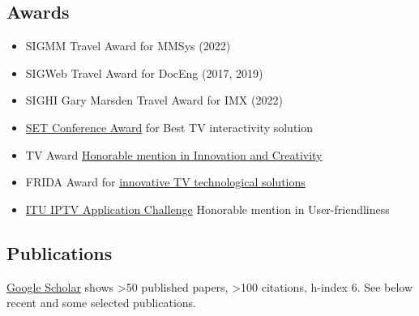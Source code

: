 \documentclass[10pt,a4paper,sans,colorlinks]{moderncv}
\begin{document}
\subsection{Awards}
  \begin{itemize}[mynosep]
    \item SIGMM Travel Award for MMSys (2022)
    \item SIGWeb Travel Award for DocEng (2017, 2019)
    \item SIGHI Gary Marsden Travel Award for IMX (2022)
  \end{itemize}
  \begin{itemize}[mynosep]
    \item \href{http://set.org.br/artigos/ed137/137_revistadaset_70.pdf}{SET Conference Award} for Best TV interactivity solution
    \item  TV Award \href{https://www.premiotv.com/es/ganadores-es/ganadores-2013-es}{Honorable mention in Innovation and Creativity}
    \item  FRIDA Award for \href{https://programafrida.net/archivos/project/brasil-4d}{innovative TV technological solutions}
  \end{itemize}
  \begin{itemize}[mynosep]
    \item \href{https://itu.int/en/ITU-T/challenges/pages/iptv.aspx}{ITU IPTV Application Challenge} Honorable mention in User-friendliness
  \end{itemize}

\subsection{Publications}

\href{https://scholar.google.com/citations?user=1bEOmkUAAAAJ&hl=en}{Google Scholar} shows >50 published papers, >100 citations, h-index 6. See below recent and some selected publications.
\end{document}

